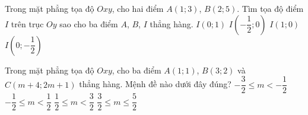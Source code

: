 \begin{ex}%
	Trong mặt phẳng tọa độ $Oxy$, cho hai điểm $A(1;3)$, $B(2;5)$. Tìm tọa độ điểm $I$ trên trục $Oy$ sao cho ba điểm $A$, $B$, $I$ thẳng hàng.
	\choice
	{\True $I(0;1)$}
	{$I\left(-\dfrac{1}{2};0\right)$}
	{$I(1;0)$}
	{$I\left(0;-\dfrac{1}{2}\right)$}
\end{ex}

\begin{ex}%
	Trong mặt phẳng tọa độ $Oxy$, cho ba điểm $A(1;1)$, $B(3;2)$ và $C(m+4;2m+1)$ thẳng hàng. Mệnh đề nào dưới đây đúng?
	\choice
	{ $-\dfrac{3}{2}\le m<-\dfrac{1}{2}$}
	{$-\dfrac{1}{2}\le m<\dfrac{1}{2}$}
	{\True $\dfrac{1}{2}\le m<\dfrac{3}{2}$}
	{$\dfrac{3}{2}\le m\le \dfrac{5}{2}$}
\end{ex}
